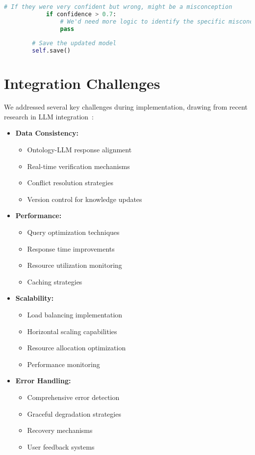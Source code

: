 \begin{lstlisting}[language=Python, caption=Student Model Implementation, label=lst:student-model]
            # If they were very confident but wrong, might be a misconception
            if confidence > 0.7:
                # We'd need more logic to identify the specific misconception
                pass
        
        # Save the updated model
        self.save()
\end{lstlisting}

\section{Integration Challenges}
\label{sec:challenges}

We addressed several key challenges during implementation, drawing from recent research in LLM integration~\cite{huang2024survey}:

\begin{itemize}
  \item \textbf{Data Consistency:} 
    \begin{itemize}
      \item Ontology-LLM response alignment
      \item Real-time verification mechanisms
      \item Conflict resolution strategies
      \item Version control for knowledge updates
    \end{itemize}
  
  \item \textbf{Performance:} 
    \begin{itemize}
      \item Query optimization techniques
      \item Response time improvements
      \item Resource utilization monitoring
      \item Caching strategies
    \end{itemize}
  
  \item \textbf{Scalability:} 
    \begin{itemize}
      \item Load balancing implementation
      \item Horizontal scaling capabilities
      \item Resource allocation optimization
      \item Performance monitoring
    \end{itemize}
  
  \item \textbf{Error Handling:} 
    \begin{itemize}
      \item Comprehensive error detection
      \item Graceful degradation strategies
      \item Recovery mechanisms
      \item User feedback systems
    \end{itemize}
\end{itemize}


